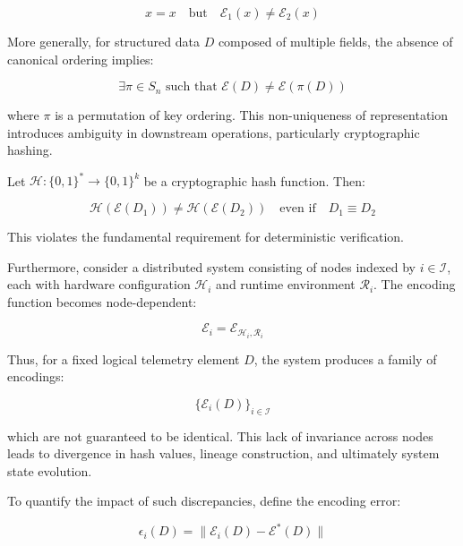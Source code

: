 \begin{equation}
x = x \quad \text{but} \quad \mathcal{E}_1(x) \neq \mathcal{E}_2(x)
\end{equation}

More generally, for structured data $D$ composed of multiple fields, the absence of canonical ordering implies:

\begin{equation}
\exists \pi \in S_n \text{ such that } \mathcal{E}(D) \neq \mathcal{E}(\pi(D))
\end{equation}

where $\pi$ is a permutation of key ordering. This non-uniqueness of representation introduces ambiguity in downstream operations, particularly cryptographic hashing.

Let $\mathcal{H}: \{0,1\}^* \rightarrow \{0,1\}^k$ be a cryptographic hash function. Then:

\begin{equation}
\mathcal{H}(\mathcal{E}(D_1)) \neq \mathcal{H}(\mathcal{E}(D_2)) \quad \text{even if} \quad D_1 \equiv D_2
\end{equation}

This violates the fundamental requirement for deterministic verification.

Furthermore, consider a distributed system consisting of nodes indexed by $i \in \mathcal{I}$, each with hardware configuration $\mathcal{H}_i$ and runtime environment $\mathcal{R}_i$. The encoding function becomes node-dependent:

\begin{equation}
\mathcal{E}_i = \mathcal{E}_{\mathcal{H}_i, \mathcal{R}_i}
\end{equation}

Thus, for a fixed logical telemetry element $D$, the system produces a family of encodings:

\begin{equation}
\{\mathcal{E}_i(D)\}_{i \in \mathcal{I}}
\end{equation}

which are not guaranteed to be identical. This lack of invariance across nodes leads to divergence in hash values, lineage construction, and ultimately system state evolution.

To quantify the impact of such discrepancies, define the encoding error:

\begin{equation}
\epsilon_i(D) = \|\mathcal{E}_i(D) - \mathcal{E}^*(D)\|
\end{equation}

